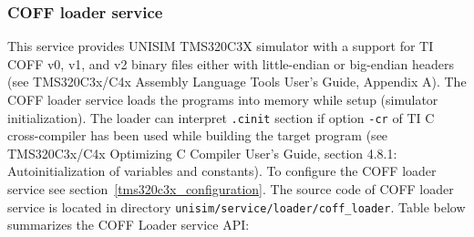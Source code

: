 \subsubsection{COFF loader service}
\label{tms320c3x_coff_loader}

This service provides UNISIM TMS320C3X simulator with a support for TI COFF v0, v1, and v2 binary files  either with little-endian or big-endian headers (see TMS320C3x/C4x Assembly Language Tools User’s Guide, Appendix A). The COFF loader service loads the programs into memory while setup (simulator initialization). The loader can interpret \texttt{.cinit} section if option \texttt{-cr} of TI C cross-compiler has been used while building the target program (see TMS320C3x/C4x Optimizing C Compiler User’s Guide, section 4.8.1: Autoinitialization of variables and constants).
To configure the COFF loader service see section~\ref{tms320c3x_configuration}.
The source code of COFF loader service is located in directory \texttt{unisim/service/loader/coff\_loader}.
\noindent Table below summarizes the COFF Loader service API:

